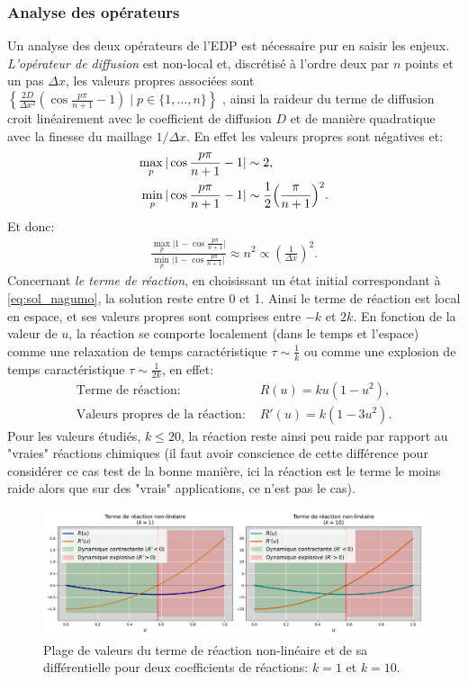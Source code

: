 \subsubsection{Analyse des opérateurs}
Un analyse des deux opérateurs de l'EDP est nécessaire pur en saisir les enjeux.
\textit{L'opérateur de diffusion} est non-local et, discrétisé à l'ordre deux par $n$ points et un pas $\Delta x$, les valeurs propres associées sont 
$\left\{ \frac{2D}{\Delta x^2} \left(\cos \frac{p\pi}{n+1} - 1\right) \mid p \in \{1,\dots,n\} \right\}$ \cite{bouchet2020laplacien}, 
ainsi la raideur du terme de diffusion croit linéairement avec le coefficient de diffusion $D$ et de manière quadratique avec la finesse du maillage $1/\Delta x$.
En effet les valeurs propres sont négatives et:
\begin{align}
    \max_p \vert\cos \frac{p\pi}{n+1} - 1 \vert &\sim 2,\\
    \min_p \vert \cos \frac{p\pi}{n+1} - 1 \vert &\sim \frac{1}{2}\Bigl( \frac{\pi}{n+1} \Bigr)^2.
\end{align}
Et donc:
\begin{align}
    \frac{\max_p \vert 1 - \cos \frac{p\pi}{n+1} \vert}{\min_p \vert 1 - \cos \frac{p\pi}{n+1} \vert} \approx n^2\propto \left(\frac{1}{\Delta x}\right)^2.
\end{align}
Concernant \textit{le terme de réaction}, en choisissant un état initial correspondant à \ref{eq:sol_nagumo},
la solution reste entre 0 et 1. Ainsi le terme de réaction est local en espace, et ses valeurs propres sont comprises entre $-k$ et $2k$.
En fonction de la valeur de $u$, la réaction se comporte localement (dans le temps et l'espace) comme une relaxation de temps caractéristique $\tau \sim \frac{1}{k}$ ou comme une explosion de temps 
caractéristique $\tau \sim \frac{1}{2k}$, en effet: 
\begin{align}
    \text{Terme de réaction: }&R(u) = ku(1-u^2),\\
    \text{Valeurs propres de la réaction: }&R'(u) = k (1 - 3u^2).
\end{align}
Pour les valeurs étudiés, $k \leq 20$, la réaction reste ainsi peu raide par rapport au "vraies" réactions chimiques (il faut avoir conscience de cette 
différence pour considérer ce cas test de la bonne manière, ici la réaction est le terme le moins raide alors que sur des "vrais" applications, ce n'est pas le cas).
\begin{figure}[htbp]
    \centering
    \includegraphics[width=\textwidth]{media/4_travail/2_nagumo/raideur_reaction_nagumo.pdf}
    \caption{Plage de valeurs du terme de réaction non-linéaire et de sa différentielle pour deux coefficients de réactions: $k=1$ et $k=10$.}
    \label{fig:raideur_reaction_nagumo}
\end{figure}


